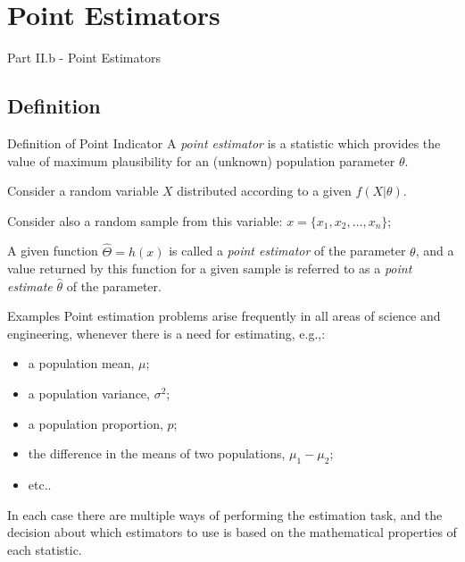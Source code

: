 \section{Point Estimators}
\begin{frame}
  \begin{center}
    Part II.b - Point Estimators
  \end{center}
\end{frame}

\subsection{Definition}
\begin{frame}{Definition of Point Indicator}
  A \emph{point estimator} is a statistic which provides the value of maximum plausibility for an (unknown) population parameter $\theta$.
  \bigskip

  Consider a random variable $X$ distributed according to a given $f(X|\theta)$.\bigskip

  Consider also a random sample from this variable: $x=\{x_1,x_2,\ldots,x_n\}$;\bigskip

  A given function $\hat{\Theta}=h\left(x\right)$ is called a \emph{point estimator} of the parameter $\theta$, and a value returned by this function for a given sample is referred to as a \emph{point estimate} $\hat{\theta}$ of the parameter.
\end{frame}

\begin{frame}{Examples}
Point estimation problems arise frequently in all areas of science and engineering, whenever there is a need for estimating, e.g.,:\bigskip

\begin{itemize}
  \item a population  mean, $\mu$;
	\item a population variance, $\sigma^2$;
	\item a population proportion, $p$;
	\item the difference in the means of two populations, $\mu_1-\mu_2$;
	\item etc..
\end{itemize}\bigskip

In each case there are multiple ways of performing the estimation task, and the decision about which estimators to use is based on the mathematical properties of each statistic.
\end{frame}

